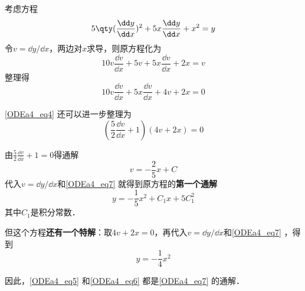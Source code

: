 \begin{example}{}\label{ODEa4_ex1}
考虑方程
\begin{equation}\label{ODEa4_eq7}
5\qty(\frac{\dd y}{\dd x})^2+5x\frac{\dd y}{\dd x}+x^2=y
\end{equation}
令$v=\dd y/\dd x$，两边对$x$求导，则原方程化为
\begin{equation}\label{ODEa4_eq8}
10v\frac{\dd v}{\dd x}+5v+5x\frac{\dd v}{\dd x}+2x=v
\end{equation}
整理得
\begin{equation}\label{ODEa4_eq4}
10v\frac{\dd v}{\dd x}+5x\frac{\dd v}{\dd x}+4v+2x=0
\end{equation}

\autoref{ODEa4_eq4} 还可以进一步整理为
\begin{equation}
(\frac{5}{2}\frac{\dd v}{\dd x}+1)(4v+2x)=0
\end{equation}

由$\frac{5}{2}\frac{\dd v}{\dd x}+1=0$得通解
\begin{equation}\label{ODEa4_eq9}
v=-\frac{2}{5}x+C
\end{equation}
代入$v=\dd y/\dd x$和\autoref{ODEa4_eq7} 就得到原方程的\textbf{第一个通解}
\begin{equation}\label{ODEa4_eq5}
y=-\frac{1}{5}x^2+C_1x+5C_1^2
\end{equation}
其中$C_1$是积分常数．

但这个方程\textbf{还有一个特解}：取$4v+2x=0$，再代入$v=\dd y/\dd x$和\autoref{ODEa4_eq7} ，得到
\begin{equation}\label{ODEa4_eq6}
y=-\frac{1}{4}x^2
\end{equation}

因此，\autoref{ODEa4_eq5} 和\autoref{ODEa4_eq6} 都是\autoref{ODEa4_eq7} 的通解．




\end{example}

